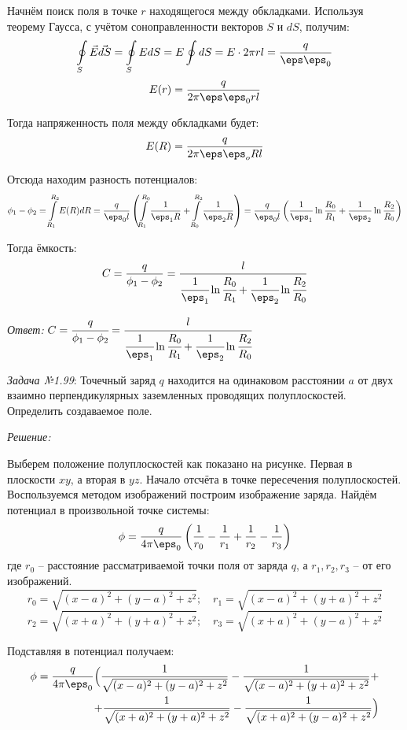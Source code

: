 Начнём поиск поля в точке \( r \) находящегося между обкладками. Используя 
теорему Гаусса, с учётом соноправленности векторов \( S \) и 
\( dS \), получим:
\[ 
	\oint\limits_S \vec{E}\vec{dS} = \oint\limits_S EdS = 
	E \oint dS = E \cdot 2\pi r l = \frac{q}{\eps\eps_0}
\]
\[
	E(r) = \frac{q}{2\pi\eps\eps_0 rl}
\]

Тогда напряженность поля между обкладками будет:
\[
	E(R) = \frac{q}{2\pi\eps\eps_o Rl}
\]

Отсюда находим разность потенциалов:
\[
	\phi_1 - \phi_2 = \int\limits^{R_2}_{R_1} E(R) dR = 
	\frac{q}{\eps_0 l} \left( 
		\int \limits^{R_0}_{R_1} \frac{1}{\eps_1 R} + 
		\int \limits^{R_2}_{R_0} \frac{1}{\eps_2 R} 
	\right) = 
	\frac{q}{\eps_0 l} \left(
		\frac{1}{\eps_1}\ln\frac{R_0}{R_1} + 
		\frac{1}{\eps_2}\ln\frac{R_2}{R_0}
	\right) 
\]

Тогда ёмкость:
\[
	C = \frac{q}{\phi_1 - \phi_2} = 
	\frac{l}{ \cfrac{1}{\eps_1}\ln\cfrac{R_0}{R_1} + 
	\cfrac{1}{\eps_2}\ln\cfrac{R_2}{R_0}}
\]

\emph{Ответ:} \(
	C = \cfrac{q}{\phi_1 - \phi_2} = 
	\cfrac{l}{ \cfrac{1}{\eps_1}\ln\cfrac{R_0}{R_1} + 
	\cfrac{1}{\eps_2}\ln\cfrac{R_2}{R_0}}
\)

\newpage

\emph{Задача №1.99}: Точечный заряд \( q \) находится на одинаковом 
расстоянии \( a \) от двух взаимно перпендикулярных заземленных проводящих 
полуплоскостей. Определить создаваемое поле.

\emph{Решение:}

Выберем положение полуплоскостей как показано на рисунке. Первая в 
плоскости \( xy \), а вторая в \( yz \). Начало отсчёта в точке 
пересечения полуплоскостей. Воспользуемся методом изображений построим 
изображение заряда. Найдём потенциал в произвольной точке системы:
\[ 
	\phi = \frac{q}{4\pi\eps_0}\left( \frac{1}{r_0} - \frac{1}{r_1} + 
	\frac{1}{r_2} - \frac{1}{r_3} \right) 
\] 
где \( r_0 \) -- расстояние рассматриваемой точки поля от заряда \( q \), а 
\( r_1, r_2, r_3 \) -- от его изображений.
\[
	r_0 = \sqrt{(x-a)^2 + (y-a)^2 + z^2};\quad
	r_1 = \sqrt{(x-a)^2 + (y+a)^2 + z^2}
\]
\[
	r_2 = \sqrt{(x+a)^2 + (y+a)^2 + z^2};\quad
	r_3 = \sqrt{(x+a)^2 + (y-a)^2 + z^2}
\]

Подставляя в потенциал получаем:
\begin{equation*}
\begin{split}
	\phi = \frac{q}{4\pi\eps_0}\Big(
		\frac{1}{\sqrt{(x-a)^2 + (y-a)^2 + z^2}} - 
		\frac{1}{\sqrt{(x-a)^2 + (y+a)^2 + z^2}} + \\ +
		\frac{1}{\sqrt{(x+a)^2 + (y+a)^2 + z^2}} -
		\frac{1}{\sqrt{(x+a)^2 + (y-a)^2 + z^2}}
	\Big)
\end{split}
\end{equation*}

